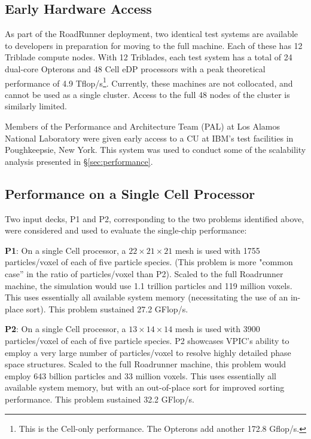\documentclass[10pt]{article}
\begin{document}
\subsection{Early Hardware Access}

As part of the RoadRunner deployment, two identical test systems are
available to developers in preparation for moving to the full machine.
Each of these has 12 Triblade compute nodes.  With 12 Triblades, each
test system has a total of 24 dual-core Opterons and 48 Cell eDP
processors with a peak theoretical performance of 4.9
Tflop/s\footnote{This is the Cell-only performance.  The Opterons add
another 172.8 Gflop/s.}.  Currently, these machines are not
collocated, and cannot be used as a single cluster.  Access to the
full 48 nodes of the cluster is similarly limited.

Members of the Performance and Architecture Team (PAL) at Los Alamos
National Laboratory were given early access to a CU at IBM's test
facilities in Poughkeepsie, New York.  This system was used to conduct
some of the scalability analysis presented in \S \ref{sec:performance}.

\subsection{Performance on a Single Cell Processor}

Two input decks, P1 and P2, corresponding to the two problems
identified above, were considered and used to evaluate the
single-chip performance:

\textbf{P1}:  On a single Cell processor, a $22 \times 21 \times 21$ mesh 
is used with 1755 particles/voxel of each of five particle species.
(This problem is more "common case'' in the ratio of particles/voxel
than P2).  Scaled to the full Roadrunner machine, the simulation would
use 1.1 trillion particles and 119 million voxels.  This uses
essentially all available system memory (necessitating the use of an
in-place sort).  This problem sustained 27.2 GFlop/s.

\textbf{P2}:  On a single Cell processor, a $13 \times 14 \times 14$ mesh 
is used with 3900 particles/voxel of each of five particle species.  P2
showcases VPIC's ability to employ a very large number of
particles/voxel to resolve highly detailed phase space structures.
Scaled to the full Roadrunner machine, this problem would employ 643
billion particles and 33 million voxels. This uses essentially all
available system memory, but with an out-of-place sort for improved
sorting performance.  This problem sustained 32.2 GFlop/s.
\end{document}
